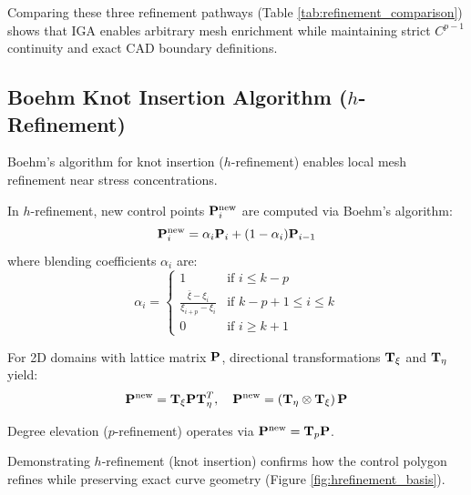 Comparing these three refinement pathways (Table \ref{tab:refinement_comparison}) shows that IGA enables arbitrary mesh enrichment while maintaining strict $C^{p-1}$ continuity and exact CAD boundary definitions.

\subsection{Boehm Knot Insertion Algorithm (\texorpdfstring{$h$-Refinement}{h-Refinement})}
Boehm's algorithm \cite{piegl1997} for knot insertion ($h$-refinement) enables local mesh refinement near stress concentrations.

In $h$-refinement, new control points $\mathbf{P}_i^{\text{new}}$ are computed via Boehm's algorithm:
\begin{equation}
    \mathbf{P}_i^{\text{new}} = \alpha_i \mathbf{P}_i + (1 - \alpha_i) \mathbf{P}_{i-1}
\end{equation}
where blending coefficients $\alpha_i$ are:
\begin{equation}
    \alpha_i = \begin{cases}
        1                                           & \text{if } i \le k - p           \\
        \frac{\bar{\xi} - \xi_i}{\xi_{i+p} - \xi_i} & \text{if } k - p + 1 \le i \le k \\
        0                                           & \text{if } i \ge k + 1
    \end{cases}
\end{equation}

For 2D domains with lattice matrix $\mathbf{P}$, directional transformations $\mathbf{T}_{\xi}$ and $\mathbf{T}_{\eta}$ yield:
\begin{equation}
    \mathbf{P}^{\text{new}} = \mathbf{T}_{\xi} \mathbf{P} \mathbf{T}_{\eta}^T, \quad \mathbf{P}^{\text{new}} = \left( \mathbf{T}_{\eta} \otimes \mathbf{T}_{\xi} \right) \mathbf{P}
\end{equation}

Degree elevation ($p$-refinement) operates via $\mathbf{P}^{\text{new}} = \mathbf{T}_p \mathbf{P}$.

Demonstrating $h$-refinement (knot insertion) confirms how the control polygon refines while preserving exact curve geometry (Figure \ref{fig:hrefinement_basis}).


